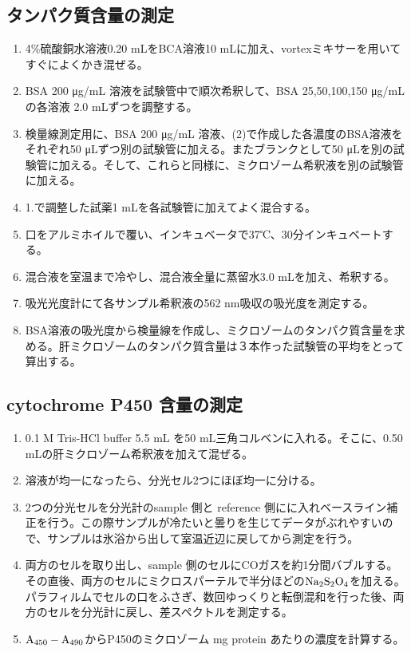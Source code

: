 \documentclass[a4paper,papersize,dvipdfmx]{jsarticle}
\begin{document}
\subsection*{タンパク質含量の測定}
\begin{enumerate}
\item 4\%硫酸銅水溶液0.20 mLをBCA溶液10 mLに加え、vortexミキサーを用いてすぐによくかき混ぜる。
\item BSA 200 μg/mL 溶液を試験管中で順次希釈して、BSA 25,50,100,150 μg/mL の各溶液 2.0 mLずつを調整する。
\item 検量線測定用に、BSA 200 μg/mL 溶液、(2)で作成した各濃度のBSA溶液をそれぞれ50 μLずつ別の試験管に加える。またブランクとして50 μLを別の試験管に加える。そして、これらと同様に、ミクロゾーム希釈液を別の試験管に加える。
\item 1.で調整した試薬1 mLを各試験管に加えてよく混合する。
\item 口をアルミホイルで覆い、インキュベータで37℃、30分インキュベートする。
\item 混合液を室温まで冷やし、混合液全量に蒸留水3.0 mLを加え、希釈する。
\item 吸光光度計にて各サンプル希釈液の562 nm吸収の吸光度を測定する。
\item BSA溶液の吸光度から検量線を作成し、ミクロゾームのタンパク質含量を求める。肝ミクロゾームのタンパク質含量は３本作った試験管の平均をとって算出する。

\end{enumerate}
\subsection*{cytochrome P450 含量の測定}
\begin{enumerate}
\item 0.1 M Tris-HCl buffer 5.5 mL を50 mL三角コルベンに入れる。そこに、0.50 mLの肝ミクロゾーム希釈液を加えて混ぜる。
\item 溶液が均一になったら、分光セル2つにほぼ均一に分ける。
\item 2つの分光セルを分光計のsample 側と reference 側にに入れベースライン補正を行う。この際サンプルが冷たいと曇りを生じてデータがぶれやすいので、サンプルは氷浴から出して室温近辺に戻してから測定を行う。
\item 両方のセルを取り出し、sample 側のセルにCOガスを約1分間バブルする。その直後、両方のセルにミクロスパーテルで半分ほどの$\rm Na_2S_2O_4$を加える。パラフィルムでセルの口をふさぎ、数回ゆっくりと転倒混和を行った後、両方のセルを分光計に戻し、差スペクトルを測定する。
\item $\rm A_{450} - A_{490}$からP450のミクロゾーム mg protein あたりの濃度を計算する。

\end{enumerate}
\end{document}
